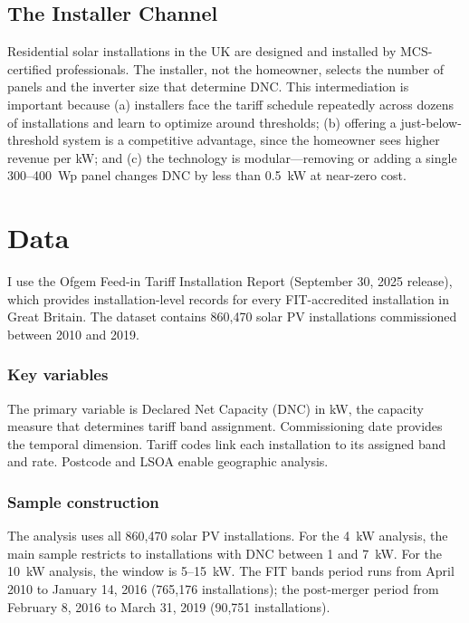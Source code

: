 \documentclass[12pt]{article}
\begin{document}
\subsection{The Installer Channel}

Residential solar installations in the UK are designed and installed by MCS-certified professionals. The installer, not the homeowner, selects the number of panels and the inverter size that determine DNC. This intermediation is important because (a) installers face the tariff schedule repeatedly across dozens of installations and learn to optimize around thresholds; (b) offering a just-below-threshold system is a competitive advantage, since the homeowner sees higher revenue per kW; and (c) the technology is modular---removing or adding a single 300--400~Wp panel changes DNC by less than 0.5~kW at near-zero cost.


\section{Data}
\label{sec:data}

I use the Ofgem Feed-in Tariff Installation Report (September 30, 2025 release), which provides installation-level records for every FIT-accredited installation in Great Britain. The dataset contains 860,470 solar PV installations commissioned between 2010 and 2019.

\subsubsection*{Key variables} The primary variable is Declared Net Capacity (DNC) in kW, the capacity measure that determines tariff band assignment. Commissioning date provides the temporal dimension. Tariff codes link each installation to its assigned band and rate. Postcode and LSOA enable geographic analysis.

\subsubsection*{Sample construction} The analysis uses all 860,470 solar PV installations. For the 4~kW analysis, the main sample restricts to installations with DNC between 1 and 7~kW. For the 10~kW analysis, the window is 5--15~kW. The FIT bands period runs from April 2010 to January 14, 2016 (765,176 installations); the post-merger period from February 8, 2016 to March 31, 2019 (90,751 installations).


\end{document}
